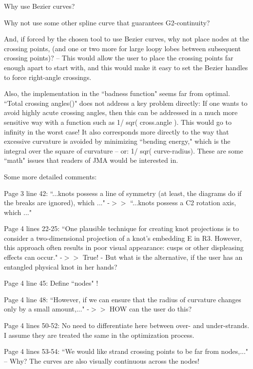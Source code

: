 \documentclass[12pt]{article}
\begin{document}
Why use Bezier curves? 

Why not use some other spline curve that guarantees G2-continuity?

And, if forced by the chosen tool to use Bezier curves, why not place
nodes at the crossing points, (and one or two more for large loopy
lobes between subsequent crossing points)?  -- This would allow the
user to place the crossing points far enough apart to start with, and
this would make it easy to set the Bezier handles to force right-angle
crossings.

Also, the implementation in the ``badness function" seems far from
optimal.  ``Total crossing angles()" does not address a key problem
directly: If one wants to avoid highly acute crossing angles, then
this can be addressed in a much more sensitive way with a function
such as 1/ sqr( cross.angle ).  This would go to infinity in the worst
case!  It also corresponds more directly to the way that excessive
curvature is avoided by minimizing ``bending energy," which is the
integral over the square of curvature -- or: 1/ sqr( curve-radius).
These are some ``math" issues that readers of JMA would be interested
in.


Some more detailed comments:

Page 3 line 42: ``...knots possess a line of symmetry (at least, the
diagrams do if the breaks are ignored), which ..."  -$>>$ ``...knots
possess a C2 rotation axis, which ..."

Page 4 lines 22-25: ``One plausible technique for creating knot
projections is to consider a two-dimensional projection of a knot's
embedding E in R3. However, this approach often results in poor visual
appearance: cusps or other displeasing effects can occur."  -$>>$ True!
- But what is the alternative, if the user has an entangled physical
knot in her hands?

Page 4 line 45: Define ``nodes" !

Page 4 line 48: ``However, if we can ensure that the radius of
curvature changes only by a small amount,..."  -$>>$ HOW can the user do
this?

Page 4 lines 50-52: No need to differentiate here between over- and
under-strands.  I assume they are treated the same in the optimization
process.

Page 4 lines 53-54: ``We would like strand crossing points to be far
from nodes,..."  -- Why?  The curves are also visually continuous across
the nodes!
\end{document}
